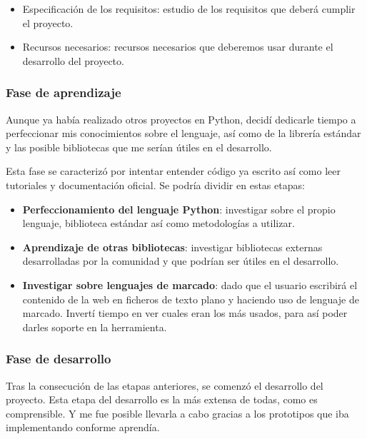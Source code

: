 \documentclass[a4paper,12pt]{article}
\begin{document}
\begin{itemize}
\item Especificación de los requisitos: estudio de los requisitos que deberá cumplir el proyecto.
\item Recursos necesarios: recursos necesarios que deberemos usar durante el desarrollo del proyecto.
\end{itemize}

\subsubsection{Fase de aprendizaje}

Aunque ya había realizado otros proyectos en Python, decidí dedicarle tiempo a perfeccionar mis conocimientos
sobre el lenguaje, así como de la librería estándar y las posible bibliotecas que me serían útiles en el desarrollo.

Esta fase se caracterizó por intentar entender código ya escrito así como leer tutoriales y documentación
oficial. Se podría dividir en estas etapas:

\begin{itemize}
\item \textbf{Perfeccionamiento del lenguaje Python}: investigar sobre el propio lenguaje, biblioteca estándar
así como metodologías a utilizar.
\item \textbf{Aprendizaje de otras bibliotecas}: investigar bibliotecas externas desarrolladas por la comunidad y
que podrían ser útiles en el desarrollo.
\item \textbf{Investigar sobre lenguajes de marcado}: dado que el usuario escribirá el contenido de la web en ficheros
de texto plano y haciendo uso de lenguaje de marcado. Invertí tiempo en ver cuales eran los más usados, para así poder
darles soporte en la herramienta.
\end{itemize}

\subsubsection{Fase de desarrollo}

Tras la consecución de las etapas anteriores, se comenzó el desarrollo del proyecto. Esta etapa del desarrollo
es la más extensa de todas, como es comprensible. Y me fue posible llevarla a cabo gracias a los
prototipos que iba implementando conforme aprendía.
\end{document}
